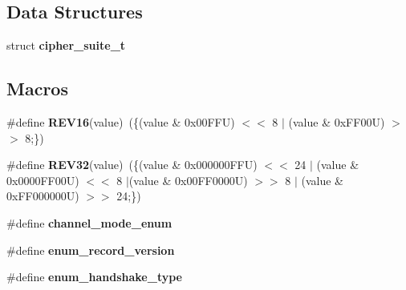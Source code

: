 \subsection*{Data Structures}
\begin{DoxyCompactItemize}
\item 
struct {\bf cipher\+\_\+suite\+\_\+t}
\end{DoxyCompactItemize}
\subsection*{Macros}
\begin{DoxyCompactItemize}
\item 
\#define {\bf R\+E\+V16}(value)~(\{(value \& 0x00\+F\+F\+U) $<$$<$ 8 $\vert$ (value \& 0x\+F\+F00\+U) $>$$>$ 8;\})
\item 
\#define {\bf R\+E\+V32}(value)~(\{(value \& 0x000000\+F\+F\+U) $<$$<$ 24 $\vert$ (value \& 0x0000\+F\+F00\+U) $<$$<$ 8 $\vert$(value \& 0x00\+F\+F0000\+U) $>$$>$ 8 $\vert$ (value \& 0x\+F\+F000000\+U) $>$$>$ 24;\})
\item 
\#define {\bf channel\+\_\+mode\+\_\+enum}
\item 
\#define {\bf enum\+\_\+record\+\_\+version}
\item 
\#define {\bf enum\+\_\+handshake\+\_\+type}
\end{DoxyCompactItemize}
